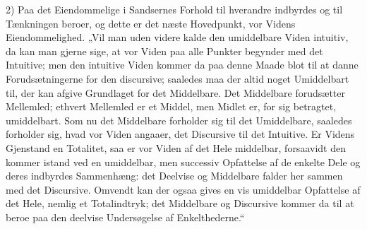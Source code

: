 \documentclass[11pt]{book}
\begin{document}
2) Paa det Eiendommelige i Sandsernes Forhold til hverandre indbyrdes
og til Tænkningen beroer, og dette er det næste Hovedpunkt, vor Videns
Eiendommelighed. „Vil man uden videre kalde den umiddelbare Viden
intuitiv, da kan man gjerne sige, at vor Viden paa alle Punkter
begynder med det Intuitive; men den intuitive Viden kommer da paa denne
Maade blot til at danne Forudsætningerne for den discursive; saaledes
maa der altid noget Umiddelbart til, der kan afgive Grundlaget for det
Middelbare. Det Middelbare forudsætter Mellemled; ethvert Mellemled er
et Middel, men Midlet er, for sig betragtet, umiddelbart. Som nu det
Middelbare forholder sig til det Umiddelbare, saaledes forholder sig,
hvad vor Viden angaaer, det Discursive til det Intuitive. Er Videns
Gjenstand en Totalitet, saa er vor Viden af det Hele middelbar,
forsaavidt den kommer istand ved en umiddelbar, men successiv
Opfattelse af de enkelte Dele og deres indbyrdes Sammenhæng: det
Deelvise og Middelbare falder her sammen med det Discursive. Omvendt
kan der ogsaa gives en vis umiddelbar Opfattelse af det Hele, nemlig et
Totalindtryk; det Middelbare og Discursive kommer da til at beroe paa
den deelvise Undersøgelse af Enkelthederne.“
\end{document}
